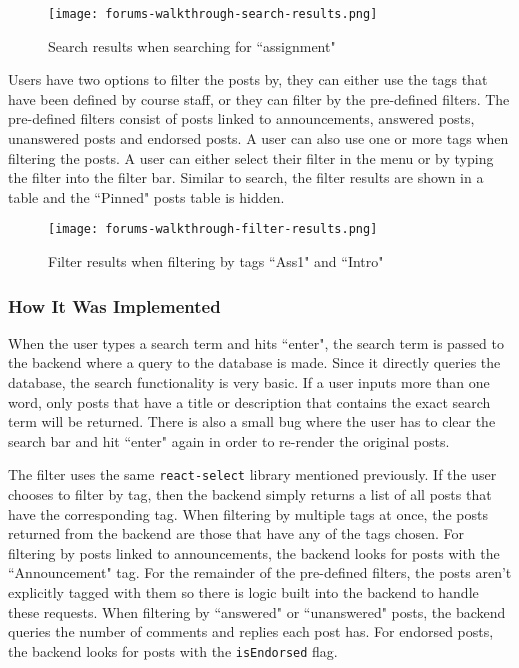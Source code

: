 \begin{figure}[h!]
    \texttt{[image: forums-walkthrough-search-results.png]}
    \centering
    \caption{Search results when searching for ``assignment"}
\end{figure}

\newpage

Users have two options to filter the posts by, they can either use the tags that have been defined by course staff, or they can filter by the pre-defined filters.
The pre-defined filters consist of posts linked to announcements, answered posts, unanswered posts and endorsed posts.
A user can also use one or more tags when filtering the posts.
A user can either select their filter in the menu or by typing the filter into the filter bar.
Similar to search, the filter results are shown in a table and the ``Pinned" posts table is hidden.

\begin{figure}[h!]
    \texttt{[image: forums-walkthrough-filter-results.png]}
    \centering
    \caption{Filter results when filtering by tags ``Ass1" and ``Intro"}
\end{figure}

\subsubsection{How It Was Implemented}
When the user types a search term and hits ``enter", the search term is passed to the backend where a query to the database is made.
Since it directly queries the database, the search functionality is very basic.
If a user inputs more than one word, only posts that have a title or description that contains the exact search term will be returned.
There is also a small bug where the user has to clear the search bar and hit ``enter" again in order to re-render the original posts.

The filter uses the same \texttt{react-select} library mentioned previously.
If the user chooses to filter by tag, then the backend simply returns a list of all posts that have the corresponding tag.
When filtering by multiple tags at once, the posts returned from the backend are those that have any of the tags chosen.
For filtering by posts linked to announcements, the backend looks for posts with the ``Announcement" tag.
For the remainder of the pre-defined filters, the posts aren't explicitly tagged with them so there is logic built into the backend to handle these requests.
When filtering by ``answered" or ``unanswered" posts, the backend queries the number of comments and replies each post has.
For endorsed posts, the backend looks for posts with the \texttt{isEndorsed} flag.

